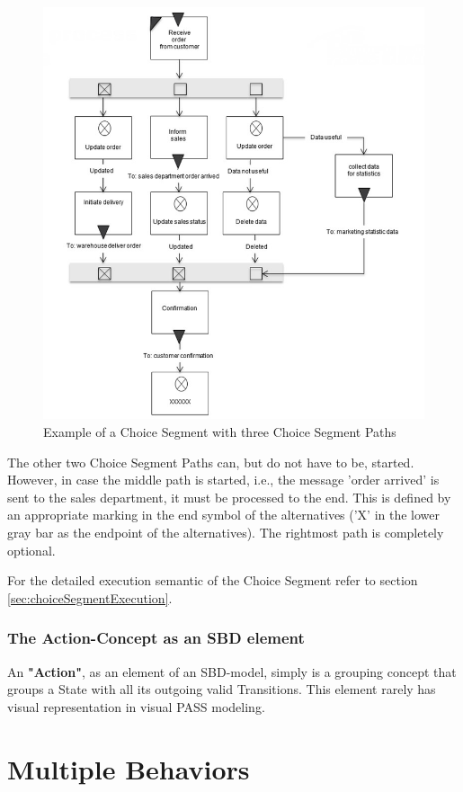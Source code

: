 \begin{figure}[htbp]
	\centering
	\includegraphics[width=0.7\linewidth]{Figures/Ontology/SubjectBehavior/ALternative}
	\caption[Example of a Choice Segment with three Choice Segment Paths]{Example of a Choice Segment with three Choice Segment Paths}
	\label{fig:alternative}
\end{figure}

The other two Choice Segment Paths can, but do not have to be, started. However, in case the middle path is started, i.e., the message 'order arrived' is sent to the sales department, it must be processed to the end. This is defined by an appropriate marking in the end symbol of the alternatives ('X' in the lower gray bar as the endpoint of the alternatives). The rightmost path is completely optional.

For the detailed execution semantic of the Choice Segment refer to section \ref{sec:choiceSegmentExecution}.

\subsubsection{The Action-Concept as an SBD element}

An \textbf{"Action"}, as an element of an SBD-model, simply is a grouping concept that groups a State with all its outgoing valid Transitions. This element rarely has visual representation in visual PASS modeling.


\section{Multiple Behaviors}

